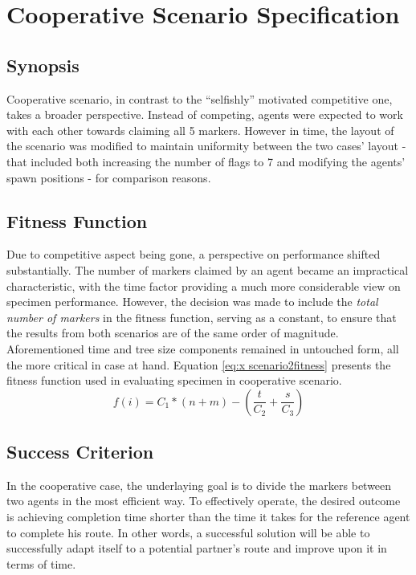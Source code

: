 \section{Cooperative Scenario Specification}
\subsection{Synopsis}
Cooperative scenario, in contrast to the ``selfishly'' motivated competitive one, takes a broader perspective. Instead of competing, agents were expected to work with each other towards claiming all 5 markers. However in time, the layout of the scenario was modified to maintain uniformity between the two cases' layout - that included both increasing the number of flags to 7 and modifying the agents' spawn positions - for comparison reasons.
\subsection{Fitness Function}
Due to competitive aspect being gone, a perspective on performance shifted substantially. The number of markers claimed by an agent became an impractical characteristic, with the time factor providing a much more considerable view on specimen performance. However, the decision was made to include the \textit{total number of markers} in the fitness function, serving as a constant, to ensure that the results from both scenarios are of the same order of magnitude. Aforementioned time and tree size components remained in untouched form, all the more critical in case at hand. Equation \ref{eq:x scenario2fitness} presents the fitness function used in evaluating specimen in cooperative scenario.
\begin{equation}
    \label{eq:x scenario2fitness}
f(i) = C_1 * (n + m) - (\frac{t}{C_2} + \frac{s}{C_3})
\end{equation} %

\subsection{Success Criterion}
\label{section_cooperative_success}
In the cooperative case, the underlaying goal is to divide the markers between two agents in the most efficient way. To effectively operate, the desired outcome is achieving completion time shorter than the time it takes for the reference agent to complete his route. In other words, a successful solution will be able to successfully adapt itself to a potential partner's route and improve upon it in terms of time.

